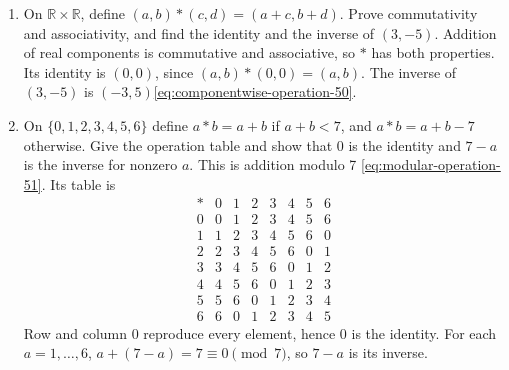 \begin{enumerate}[label=\theenumi,leftmargin=4mm,itemsep=9pt]
\[\textbf{2. Symmetric.} Symmetry requires $(a,b)\in R$ to imply $(b,a)\in R$. Choose $a=\sqrt3$ and $b=0$. Then
\[
a-b+\sqrt3=2\sqrt3
\]
is irrational, so $(a,b)\in R$. Reversing the pair gives
\[
b-a+\sqrt3=0,
\]
which is rational, so $(b,a)\notin R$. Hence $R$ is not symmetric.

\textbf{3. Transitive.} Transitivity requires $(a,b),(b,c)\in R$ to imply $(a,c)\in R$. Choose $a=\sqrt3$, $b=0$, and $c=2\sqrt3$. Then
\[
a-b+\sqrt3=2\sqrt3,\qquad b-c+\sqrt3=-\sqrt3,
\]
both irrational, so $(a,b),(b,c)\in R$. However,
\[
a-c+\sqrt3=\sqrt3-2\sqrt3+\sqrt3=0,
\]
which is rational. Thus $(a,c)\notin R$, and $R$ is not transitive.

\textbf{Conclusion.} $R\text{ is reflexive, but neither symmetric nor transitive.}$

\setcounter{enumi}{49}\item On $\mathbb R\times\mathbb R$, define $(a,b)*(c,d)=(a+c,b+d)$. Prove commutativity and associativity, and find the identity and the inverse of $(3,-5)$.
\solution Addition of real components is commutative and associative, so $*$ has both properties. Its identity is $(0,0)$, since $(a,b)*(0,0)=(a,b)$. The inverse of $(3,-5)$ is $(-3,5)$\qquad\eqref{eq:componentwise-operation-50}.

\setcounter{enumi}{50}\item On $\{0,1,2,3,4,5,6\}$ define $a*b=a+b$ if $a+b<7$, and $a*b=a+b-7$ otherwise. Give the operation table and show that 0 is the identity and $7-a$ is the inverse for nonzero $a$.
\solution This is addition modulo 7 \eqref{eq:modular-operation-51}. Its table is
\[
\begin{array}{c|rrrrrrr}
* &0&1&2&3&4&5&6\\\hline
0&0&1&2&3&4&5&6\\
1&1&2&3&4&5&6&0\\
2&2&3&4&5&6&0&1\\
3&3&4&5&6&0&1&2\\
4&4&5&6&0&1&2&3\\
5&5&6&0&1&2&3&4\\
6&6&0&1&2&3&4&5
\end{array}
\]
Row and column 0 reproduce every element, hence 0 is the identity. For each $a=1,\ldots,6$, $a+(7-a)=7\equiv0\pmod7$, so $7-a$ is its inverse.

\]
\end{enumerate}
